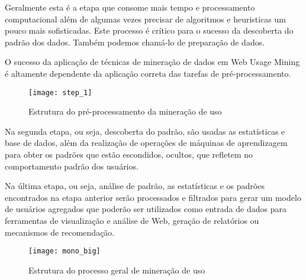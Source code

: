 	Geralmente esta é a etapa que consome mais tempo e processamento computacional além de  algumas vezes precisar de algoritmos e heuristicas um pouco mais sofisticadas. Este processo é crítico para o sucesso da descoberta do padrão dos dados. Também podemos chamá-lo de preparação de dados.

	O sucesso da aplicação de técnicas de mineração de dados em Web Usage Mining é altamente dependente da aplicação correta das tarefas de pré-processamento.

\begin{figure}[!htb]
\centering
\texttt{[image: step\_1]}
\caption{Estrutura do pré-processamento da mineração de uso}
\label{Rotulo}
\end{figure}


	Na segunda etapa, ou seja, descoberta do padrão, são usadas as estatísticas e base de dados, além da realização de operações de máquinas de aprendizagem para obter os padrões que estão escondidos, ocultos, que refletem no comportamento padrão dos usuários.

	Na última etapa, ou seja, análise de padrão, as estatísticas e os padrões encontrados na etapa anterior serão processados e filtrados para gerar um modelo de usuários agregados que poderão ser utilizados como entrada de dados para ferramentas de visualização e análise de Web, geração de relatórios ou mecanismos de recomendação.


\begin{figure}[!htb]
\centering
\texttt{[image: mono\_big]}
\caption{Estrutura do processo geral de mineração de uso}
\label{Rotulo}
\end{figure}

